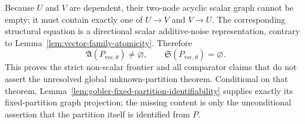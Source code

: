 Because \(U\) and \(V\) are dependent, their two-node acyclic scalar graph cannot be empty; it must contain exactly one of \(U\to V\) and \(V\to U\).  The corresponding structural equation is a directional scalar additive-noise representation, contrary to Lemma~\ref{lem:vector-family-atomicity}.  Therefore
\[
\mathfrak A(P_{\mathrm{vec},\theta})\neq\varnothing,
\qquad
\mathfrak S(P_{\mathrm{vec},\theta})=\varnothing.
\]
This proves the strict non-scalar frontier and all comparator claims that do not assert the unresolved global unknown-partition theorem.  Conditional on that theorem, Lemma~\ref{lem:gobler-fixed-partition-identifiability} supplies exactly its fixed-partition graph projection; the missing content is only the unconditional assertion that the partition itself is identified from \(P\).